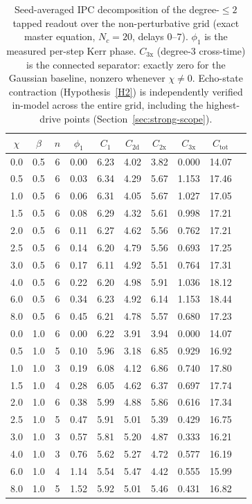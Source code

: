 \documentclass[11pt]{article}
\theoremstyle{remark}
\begin{document}
\begin{table}[H]
\centering
\caption{Seed-averaged IPC decomposition of the degree-$\le2$ tapped readout over the
non-perturbative grid (exact master equation, $N_c=20$, delays $0$--$7$). $\phi_1$ is
the measured per-step Kerr phase. $C_{3\mathrm{x}}$ (degree-3 cross-time) is the
connected separator: exactly zero for the Gaussian baseline, nonzero whenever
$\chi\ne0$. Echo-state contraction (Hypothesis~\ref{H2}) is independently verified
in-model across the entire grid, including the highest-drive points
(Section~\ref{sec:strong-scope}).}
\label{tab:strongipc}
\begin{tabular}{cccccccccc}
\toprule
$\chi$ & $\beta$ & $n$ & $\phi_1$ & $C_1$ & $C_{2\mathrm{d}}$ & $C_{2\mathrm{x}}$ & $C_{3\mathrm{x}}$ & $C_{\mathrm{tot}}$ \\
\midrule
0.0 & 0.5 & 6 & 0.00 & 6.23 & 4.02 & 3.82 & 0.000 & 14.07 \\
0.5 & 0.5 & 6 & 0.03 & 6.34 & 4.29 & 5.67 & 1.153 & 17.46 \\
1.0 & 0.5 & 6 & 0.06 & 6.31 & 4.05 & 5.67 & 1.027 & 17.05 \\
1.5 & 0.5 & 6 & 0.08 & 6.29 & 4.32 & 5.61 & 0.998 & 17.21 \\
2.0 & 0.5 & 6 & 0.11 & 6.27 & 4.62 & 5.56 & 0.762 & 17.21 \\
2.5 & 0.5 & 6 & 0.14 & 6.20 & 4.79 & 5.56 & 0.693 & 17.25 \\
3.0 & 0.5 & 6 & 0.17 & 6.11 & 4.92 & 5.51 & 0.764 & 17.31 \\
4.0 & 0.5 & 6 & 0.22 & 6.20 & 4.98 & 5.91 & 1.036 & 18.12 \\
6.0 & 0.5 & 6 & 0.34 & 6.23 & 4.92 & 6.14 & 1.153 & 18.44 \\
8.0 & 0.5 & 6 & 0.45 & 6.21 & 4.78 & 5.57 & 0.680 & 17.23 \\
\midrule
0.0 & 1.0 & 6 & 0.00 & 6.22 & 3.91 & 3.94 & 0.000 & 14.07 \\
0.5 & 1.0 & 5 & 0.10 & 5.96 & 3.18 & 6.85 & 0.929 & 16.92 \\
1.0 & 1.0 & 3 & 0.19 & 6.08 & 4.12 & 6.86 & 0.740 & 17.80 \\
1.5 & 1.0 & 4 & 0.28 & 6.05 & 4.62 & 6.37 & 0.697 & 17.74 \\
2.0 & 1.0 & 6 & 0.38 & 5.99 & 4.88 & 5.86 & 0.616 & 17.34 \\
2.5 & 1.0 & 5 & 0.47 & 5.91 & 5.01 & 5.39 & 0.429 & 16.75 \\
3.0 & 1.0 & 3 & 0.57 & 5.81 & 5.20 & 4.87 & 0.333 & 16.21 \\
4.0 & 1.0 & 3 & 0.76 & 5.62 & 5.27 & 4.72 & 0.577 & 16.19 \\
6.0 & 1.0 & 4 & 1.14 & 5.54 & 5.47 & 4.42 & 0.555 & 15.99 \\
8.0 & 1.0 & 5 & 1.52 & 5.92 & 5.01 & 5.46 & 0.431 & 16.82 \\
\bottomrule
\end{tabular}
\end{table}
\end{document}
